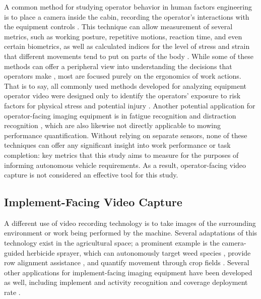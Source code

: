 \documentclass[
]{article}
\begin{document}
A common method for studying operator behavior in human factors
engineering is to place a camera inside the cabin, recording the
operator's interactions with the equipment controls
\parencite{Buchholz_ErgonomicsErgonomicAssessment_1997,Grandi_DesignErgonomicDashboards_2022}.
This technique can allow measurement of several metrics, such as working
posture, repetitive motions, reaction time, and even certain biometrics,
as well as calculated indices for the level of stress and strain that
different movements tend to put on parts of the body
\parencite{Lowe_ErgonomicsAssessmentMethods_2019,Greene_VisualizingStressfulAspects_2017,Valero_MusculoskeletalDisordersConstruction_2016,Cocca_AssessmentBiomechanicalRisk_2008}.
While some of these methods can offer a peripheral view into
understanding the decisions that operators make
\parencite{Grandi_DesignErgonomicDashboards_2022}, most are focused
purely on the ergonomics of work actions. That is to say, all commonly
used methods developed for analyzing equipment operator video were
designed only to identify the operators' exposure to risk factors for
physical stress and potential injury
\parencite{Greene_VisualizingStressfulAspects_2017}. Another potential
application for operator-facing imaging equipment is in fatigue
recognition \parencite{Zhang_DevelopmentRescueSystem_2018} and
distraction recognition \parencite{Moslemi_ComputerVisionBased_2021},
which are also likewise not directly applicable to mowing performance
quantification. Without relying on separate sensors, none of these
techniques can offer any significant insight into work performance or
task completion: key metrics that this study aims to measure for the
purposes of informing autonomous vehicle requirements. As a result,
operator-facing video capture is not considered an effective tool for
this study.

\subsection{Implement-Facing Video Capture}\label{sec:mow_video}

A different use of video recording technology is to take images of the
surrounding environment or work being performed by the machine. Several
adaptations of this technology exist in the agricultural space; a
prominent example is the camera-guided herbicide sprayer, which can
autonomously target weed species
\parencite{Moeller_ComputerVisionVersatile_2010}, provide row alignment
assistance \parencite{Maheshwary_LowCostEmbedded_2023}, and quantify
movement through crop fields
\parencite{Stanhope_ApplicationsLowCost_2016}. Several other applications
for implement-facing imaging equipment have been developed as well,
including implement and activity recognition
\parencite{ANQilin_LightweightRepvitBased_2025} and coverage deployment
rate \parencite{Luo_DevelopmentApplicationRemote_2022}.
\end{document}
